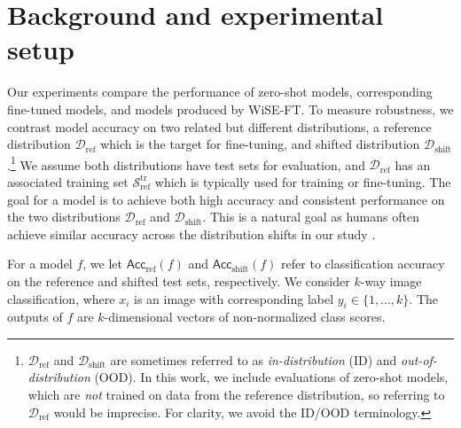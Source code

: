 \beforesec
\section{Background and experimental setup}\label{sec:expsetup}
\postsec

Our experiments compare the performance of zero-shot models, corresponding fine-tuned models, and models produced by WiSE-FT. 
To measure robustness, we contrast model accuracy on two related but different distributions, a reference distribution $\mathcal{D}_{\mathrm{ref}}$ which is the target for fine-tuning, and shifted distribution $\mathcal{D}_{\mathrm{shift}}$.\footnote{$\mathcal{D}_{\mathrm{ref}}$ and $\mathcal{D}_{\mathrm{shift}}$ are sometimes referred to as \textit{in-distribution} (ID) and \textit{out-of-distribution} (OOD). In this work, we include evaluations of zero-shot models, which are \textit{not} trained on data from the reference distribution, so referring to $\mathcal{D}_{\mathrm{ref}}$ would be imprecise. For clarity, we avoid the ID/OOD terminology.}
We assume both distributions have test sets for evaluation, and $\mathcal{D}_{\mathrm{ref}}$ has an associated training set $\mathcal{S}_{\mathrm{ref}}^\text{tr}$ which is typically used for training or fine-tuning.
The goal for a model is to achieve both high accuracy and consistent performance on the two distributions $\mathcal{D}_{\mathrm{ref}}$ and $\mathcal{D}_{\mathrm{shift}}$.
This is a natural goal as humans often achieve similar accuracy across the distribution shifts in our study \cite{shankar2020evaluating}.

For a model $f$, we let $\mathsf{Acc}_{\mathrm{ref}}(f)$ and $\mathsf{Acc}_{\mathrm{shift}}(f)$ refer to classification accuracy on the reference and shifted test sets, respectively. 
We consider $k$-way image classification, where $x_i$ is an image with corresponding label $y_i \in \{1,...,k\}$. 
The outputs of $f$ are $k$-dimensional vectors of non-normalized class scores.


